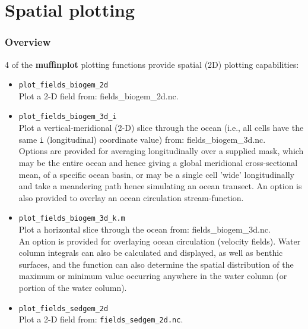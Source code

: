 \documentclass[11pt,fleqn]{book} %
\begin{document}

\section{Spatial plotting}


\subsubsection{Overview}

4 of the \textbf{muffinplot} plotting functions provide spatial (2D) plotting capabilities:
\vspace{2mm}
\begin{itemize}

\item \texttt{plot\_fields\_biogem\_2d}
\\Plot a 2-D field from: \footnotesize\textsf{fields\_biogem\_2d.nc}\normalsize.

\item \texttt{plot\_fields\_biogem\_3d\_i}
\\Plot a vertical-meridional (2-D) slice through the ocean (i.e., all cells have the same \texttt{i} (longitudinal) coordinate value) from: \footnotesize\textsf{fields\_biogem\_3d.nc}\normalsize.
\\Options are  provided for averaging longitudinally over a supplied mask, which may be the entire ocean and hence giving a global meridional cross-sectional mean, of a specific ocean basin, or may be a single cell 'wide' longitudinally and take a meandering path hence simulating an ocean transect. An option is also provided to overlay an ocean circulation stream-function.

\item \texttt{plot\_fields\_biogem\_3d\_k.m}
\\Plot a horizontal slice through the ocean from: \footnotesize\textsf{fields\_biogem\_3d.nc}\normalsize.
\\An option is provided for overlaying ocean circulation (velocity fields). Water column integrals  can also be calculated and displayed, as well as benthic surfaces, and the function can also determine the spatial distribution of the maximum or minimum value occurring anywhere in the water column (or portion of the water column).

\item \texttt{plot\_fields\_sedgem\_2d}
\\Plot a 2-D field from: \texttt{fields\_sedgem\_2d.nc}.

\end{itemize}
\vspace{2mm}
\end{document}
